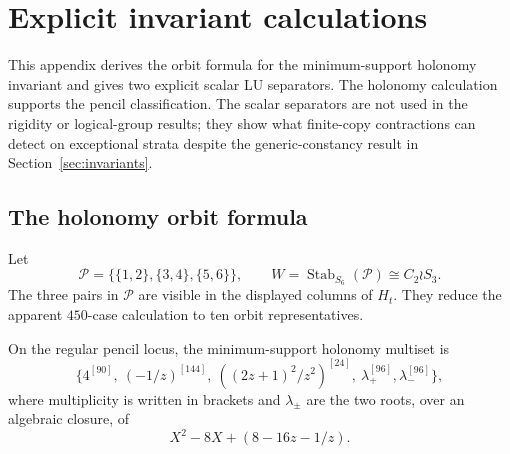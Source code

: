 \section{Explicit invariant calculations}\label{sec:scalar-certificates}

This appendix derives the orbit formula for the minimum-support holonomy
invariant and gives two explicit scalar LU separators.  The holonomy
calculation supports the pencil classification.  The scalar separators are
not used in the rigidity or logical-group results; they show what finite-copy
contractions can detect on exceptional strata despite the generic-constancy
result in Section~\ref{sec:invariants}.

\subsection{The holonomy orbit formula}
\label{sec:holonomy-certificate}

Let
\[
 \mathcal P=\{\{1,2\},\{3,4\},\{5,6\}\},\qquad
 W=\operatorname{Stab}_{S_6}(\mathcal P)\cong C_2\wr S_3.
\]
The three pairs in \(\mathcal P\) are visible in the displayed columns of
\(H_t\).  They reduce the apparent \(450\)-case calculation to ten orbit
representatives.

\begin{lemma}\label{lem:holonomy-orbit-formula}
On the regular pencil locus, the minimum-support holonomy multiset is
\begin{equation}\label{eq:holonomy-invariant-multiset}
 \{4^{[90]},\ (-1/z)^{[144]},\ ((2z+1)^2/z^2)^{[24]},\
   \lambda_+^{[96]},\lambda_-^{[96]}\},
\end{equation}
where multiplicity is written in brackets and \(\lambda_\pm\) are the two
roots, over an algebraic closure, of
\[
 X^2-8X+(8-16z-1/z).
\]
\end{lemma}


